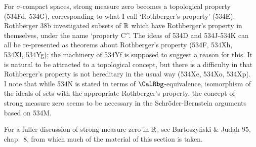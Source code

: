 {For $\sigma$-compact spaces, strong measure zero becomes a topological
property (534Fd, 534G), corresponding to what I call
`Rothberger's property'
(534E).   {\smc Rothberger 38b} investigated subsets of $\Bbb R$
which have Rothberger's property in themselves, under the name `property
C$'$'.   The ideas of 534D and 534J-534K can all be re-presented as
theorems about Rothberger's property (534F,
534Xh, 534Xl, 534Yg);  the machinery of 534Yf is supposed to
suggest a reason for this.   It is natural to be attracted to a
topological concept, but there is a difficulty in that Rothberger's
property is not hereditary in the usual way (534Xe, 534Xo, 534Xp).
I note that while 534N is stated in terms of
$\CalRbg$-equivalence, isomorphism of the ideals of sets with the
appropriate Rothberger's property, the concept of strong measure zero
seems to be necessary in the Schr\"oder-Bernstein arguments based on 534M.

For a fuller discussion of strong measure zero in $\Bbb R$, see
{\smc Bartoszy\'nski \& Judah 95}, chap.\ 8, from which much of the
material of this section is taken.
}%

\discrpage

